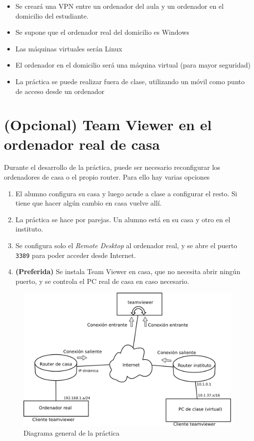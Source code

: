 \begin{itemize}
\item Se creará una VPN entre un ordenador del aula y un ordenador en el domicilio del estudiante.
\item Se supone que el ordenador real del domicilio es Windows
\item Las máquinas virtuales serán Linux
\item El ordenador en el domicilio será una máquina virtual (para mayor seguridad)
\item La práctica se puede realizar fuera de clase, utilizando un móvil como punto de acceso desde un ordenador  
\end{itemize}

\section{(Opcional) Team Viewer en el ordenador real de casa}
Durante el desarrollo de la práctica, puede ser necesario reconfigurar los ordenadores de casa o el propio router. Para ello hay varias opciones
\begin{enumerate}
\item El alumno configura su casa y luego acude a clase a configurar el resto. Si tiene que hacer algún cambio en casa vuelve allí.
\item La práctica se hace por parejas. Un alumno está en su casa y otro en el instituto.
  
\item Se configura solo el \textit{Remote Desktop} al ordenador real, y se abre el puerto \texttt{3389} para poder acceder desde Internet.
\item \textbf{(Preferida)} Se instala Team Viewer en casa, que no necesita abrir ningún puerto, y se controla el PC real de casa en caso necesario. 
\end{enumerate}

\begin{figure}[h]
  \begin{center}
    \includegraphics[width=.9\textwidth]{./media/practica-vpn-teamviewer.pdf}
  \end{center}
  \caption{Diagrama general de la práctica}\label{fig:diagrama-general}
\end{figure}

